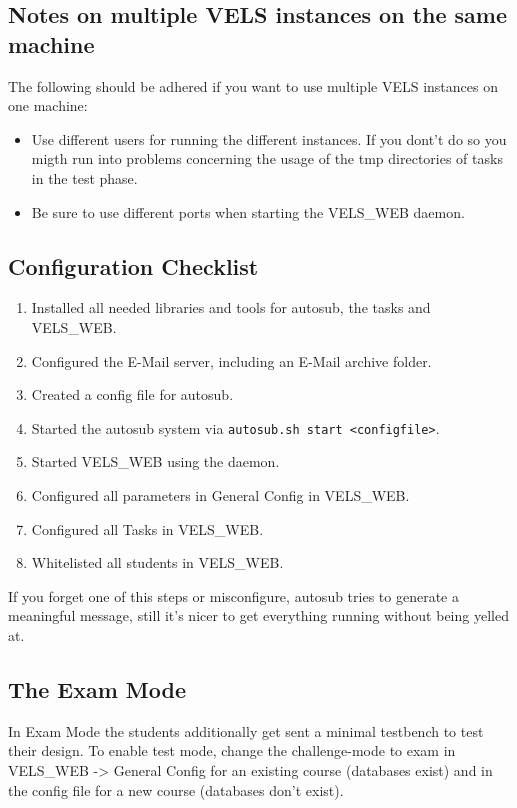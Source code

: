 \subsection{Notes on multiple VELS instances on the same machine}

The following should be adhered if you want to use multiple VELS instances on
one machine:
\begin{itemize}
\item Use different users for running the different instances. If you dont't do
	so you migth run into problems concerning the usage of the tmp directories of
	tasks in the test phase.
\item Be sure to use different ports when starting the VELS\_WEB daemon.
\end{itemize}

\subsection{Configuration Checklist} \label{sub:configChecklist}

\begin{enumerate}
\item Installed all needed libraries and tools for autosub, the tasks and VELS\_WEB.
\item Configured the E-Mail server, including an E-Mail archive folder.
\item Created a config file for autosub.
\item Started the autosub system via {\tt autosub.sh start <configfile>}.
\item Started VELS\_WEB using the daemon.
\item Configured all parameters in General Config in VELS\_WEB.
\item Configured all Tasks in VELS\_WEB.
\item Whitelisted all students in VELS\_WEB.
\end{enumerate}

If you forget one of this steps or misconfigure, autosub tries to generate a meaningful
message, still it's nicer to get everything running without being yelled at.

\subsection{The Exam Mode}\label{sub:exammode}
In Exam Mode the students additionally get sent a minimal testbench to test their design.
To enable test mode, change the challenge-mode to exam in VELS\_WEB -> General Config for
an existing course (databases exist) and in the config file for a new course (databases
don't exist).

